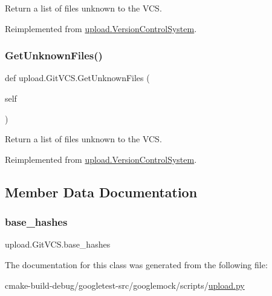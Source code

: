 \begin{DoxyVerb}Return a list of files unknown to the VCS.\end{DoxyVerb}
 

Reimplemented from \mbox{\hyperlink{classupload_1_1VersionControlSystem_a56a60e56aa9aff3df4001d2f84cab884}{upload.\+Version\+Control\+System}}.

\mbox{\label{classupload_1_1GitVCS_ae4e8c0e9fa01619c6a5c76d1ab84b995}} 
\subsubsection{\texorpdfstring{GetUnknownFiles()}{GetUnknownFiles()}\hspace{0.1cm}{\footnotesize\ttfamily [2/2]}}
{\footnotesize\ttfamily def upload.\+Git\+V\+C\+S.\+Get\+Unknown\+Files (\begin{DoxyParamCaption}\item[{}]{self }\end{DoxyParamCaption})}

\begin{DoxyVerb}Return a list of files unknown to the VCS.\end{DoxyVerb}
 

Reimplemented from \mbox{\hyperlink{classupload_1_1VersionControlSystem_a56a60e56aa9aff3df4001d2f84cab884}{upload.\+Version\+Control\+System}}.



\subsection{Member Data Documentation}
\mbox{\label{classupload_1_1GitVCS_a07e9469050a157f34fe804cdf6ecddac}} 
\subsubsection{\texorpdfstring{base\_hashes}{base\_hashes}}
{\footnotesize\ttfamily upload.\+Git\+V\+C\+S.\+base\+\_\+hashes}



The documentation for this class was generated from the following file\+:\begin{DoxyCompactItemize}
\item 
cmake-\/build-\/debug/googletest-\/src/googlemock/scripts/\mbox{\hyperlink{googlemock_2scripts_2upload_8py}{upload.\+py}}\end{DoxyCompactItemize}
